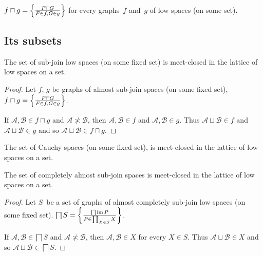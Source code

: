 \begin{cor}
$f\sqcap g = \left\{ \frac{F\sqcap G}{F\in f,G\in g}\right\}$ for every graphs~$f$ and~$g$ of low spaces (on some set).
\end{cor}




\subsection{Its subsets}

\begin{prop}
The set of sub-join low spaces (on some fixed set) is meet-closed in the lattice of low spaces on a set.
\end{prop}

\begin{proof}
Let $f$, $g$ be graphs of almost sub-join spaces (on some fixed set), $f\sqcap g = \left\{ \frac{F\sqcap G}{F\in f,G\in g}\right\}$.

If $\mathcal{A}, \mathcal{B} \in f\sqcap g$ and $\mathcal{A}
\nasymp \mathcal{B}$, then $\mathcal{A}, \mathcal{B} \in f$ and $\mathcal{A}, \mathcal{B} \in g$.
Thus $\mathcal{A}\sqcup\mathcal{B}\in f$ and $\mathcal{A}\sqcup\mathcal{B}\in g$ and so
$\mathcal{A} \sqcup \mathcal{B} \in f\sqcap g$.
\end{proof}

\begin{cor}
The set of Cauchy spaces (on some fixed set), is meet-closed in the lattice of low spaces on a set.
\end{cor}

\begin{prop}
The set of completely almost sub-join spaces is meet-closed in the lattice of low spaces on a set.
\end{prop}

\begin{proof}
Let $S$~be a set of graphs of almost completely sub-join low spaces (on some fixed set). $ \bigsqcap S = \left\{ \frac{ \bigsqcap
\operatorname{im} P }{ P \in \prod_{X \in S}  X}\right\}$.

If $\mathcal{A}, \mathcal{B} \in  \bigsqcap S$ and $\mathcal{A}
\nasymp \mathcal{B}$, then $\mathcal{A}, \mathcal{B} \in  X$ for
every $X \in S$. Thus $\mathcal{A} \sqcup \mathcal{B} \in  X$ and so
$\mathcal{A} \sqcup \mathcal{B} \in  \bigsqcap S$.
\end{proof}

